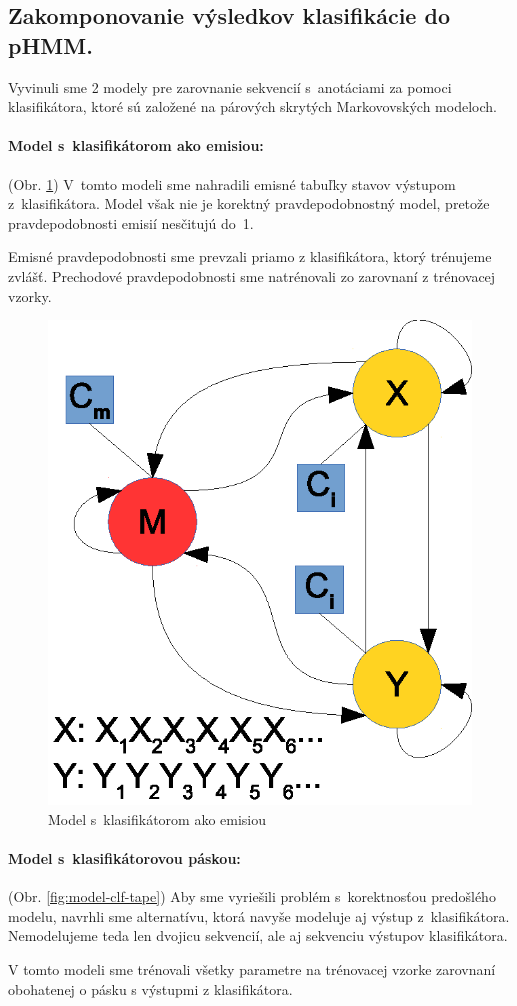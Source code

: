 \documentclass[myposter,portrait]{sciposter}
\def\mysection#1{
{\color{sectionCol}\section*{\sc\bfseries #1}}}
\begin{document}
\begin{multicols*}{3}
\mysection{Zakomponovanie výsledkov klasifikácie do pHMM.}

Vyvinuli sme 2 modely pre zarovnanie sekvencií s~anotáciami za pomoci klasifikátora, ktoré sú založené na párových skrytých Markovovských modeloch.

\paragraph{Model s~klasifikátorom ako emisiou:} (Obr. \ref{fig:model-clf})
V~tomto modeli sme nahradili emisné tabuľky stavov výstupom z~klasifikátora.
Model však nie je korektný pravdepodobnostný model, pretože pravdepodobnosti emisií nesčitujú do~1.

Emisné pravdepodobnosti sme prevzali priamo z klasifikátora, ktorý trénujeme zvlášť. Prechodové pravdepodobnosti sme natrénovali zo zarovnaní z trénovacej vzorky.

\begin{figure}[htp]
        \centering
        \includegraphics[width=.5\textwidth, clip=true]{images/model_clf}
        \caption{Model s~klasifikátorom ako emisiou}
        \label{fig:model-clf}
\end{figure}


\paragraph{Model s~klasifikátorovou páskou:} (Obr. \ref{fig:model-clf-tape})
Aby sme vyriešili problém s~korektnosťou predošlého modelu, navrhli sme alternatívu, ktorá navyše modeluje aj výstup z~klasifikátora.
Nemodelujeme teda len dvojicu sekvencií, ale aj sekvenciu výstupov klasifikátora.

V tomto modeli sme trénovali všetky parametre na trénovacej vzorke zarovnaní obohatenej o pásku s výstupmi z klasifikátora.


\end{multicols*}
\end{document}
